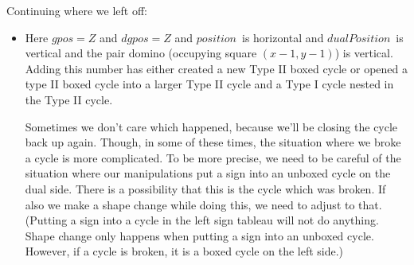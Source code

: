 \documentclass[12pt]{article}
\numberwithin{equation}{section}
\newcommand{\pos}{$position$}
\newcommand{\dpos}{$dualPosition$}
\begin{document}
  Continuing where we left off:
  \begin{itemize}
    \item Here $gpos = Z$ and $dgpos = Z$ and \pos\ is horizontal and \linebreak\dpos\ is vertical and the pair domino (occupying square \linebreak$(x - 1, y - 1)$) is vertical.
    Adding this number has either created a new Type II boxed cycle or opened a type II boxed cycle into a larger Type II cycle and a Type I cycle nested in the Type II cycle.

    Sometimes we don't care which happened, because we'll be closing the cycle back up again.
    Though, in some of these times, the situation where we broke a cycle is more complicated.
    To be more precise, we need to be careful of the situation where our manipulations put a sign into an unboxed cycle on the dual side. There is a possibility that this is the cycle which was broken.
    If also we make a shape change while doing this, we need to adjust to that.
    (Putting a sign into a cycle in the left sign tableau will not do anything.
    Shape change only happens when putting a sign into an unboxed cycle.
    However, if a cycle is broken, it is a boxed cycle on the left side.)


\end{itemize}
\end{document}
